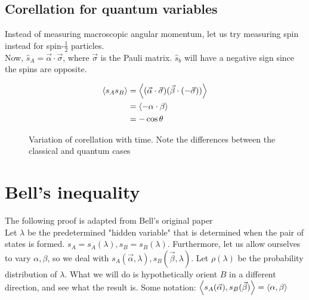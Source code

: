 \documentclass[10pt, twocolumn]{article}
\begin{document}
\subsection{Corellation for quantum variables}
Instead of measuring macroscopic angular momentum, let us try measuring spin instead for spin-$\frac12$ particles.\\

Now, $\hat s_A=\vec\alpha\cdot\vec \sigma$, where $\vec \sigma$ is the Pauli matrix. $\hat s_b$ will have a negative sign since the spins are opposite.

\begin{align*}
\Braket{s_As_B} &= \Braket{(\vec\alpha\cdot\vec \sigma)(\vec\beta\cdot(-\vec \sigma))}\\
&= \Braket{-\alpha\cdot\beta}\\
&= -\cos{\theta}
\end{align*}
\begin{figure}

\caption{Variation of corellation with time. Note the differences between the classical and quantum cases}
\end{figure}
\section{Bell's inequality}
The following proof is adapted from Bell's original paper\cite{bell}\\

Let $\lambda$ be the predetermined "hidden variable" that is determined when the pair of states is formed. $s_A=s_A(\lambda), s_B=s_B(\lambda)$. Furthermore, let us allow ourselves to vary $\alpha, \beta$, so we deal with $s_A(\vec \alpha,\lambda), s_B(\vec \beta,\lambda)$. Let $\rho(\lambda)$ be the probability distribution of $\lambda$. What we will do is hypothetically orient $B$ in a different direction, and see what the result is. Some notation: $\Braket{s_A(\vec \alpha),s_B(\vec \beta)}=\Braket{\alpha,\beta}$
\end{document}
